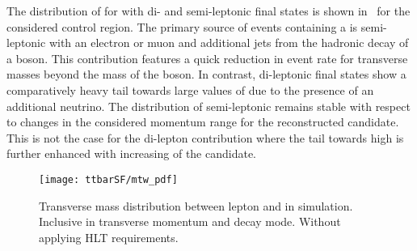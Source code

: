 The distribution of \mTW for \ttbar with di- and semi-leptonic final
states is shown in~ for the considered
control region.
The primary source of events containing a \faketauhadvis is
semi-leptonic \ttbar with an electron or muon and additional jets from
the hadronic decay of a \PW boson. This contribution features a quick
reduction in event rate for transverse masses beyond the mass of the
\PW boson. In contrast, di-leptonic \ttbar final states show a
comparatively heavy tail towards large values of \mTW due to the
presence of an additional neutrino.  The \mTW distribution of
semi-leptonic \ttbar remains stable with respect to changes in the
considered momentum range for the reconstructed \tauhadvis
candidate. This is not the case for the di-lepton contribution where
the tail towards high \mTW is further enhanced with increasing \pT of
the \tauhadvis candidate.




\begin{figure}[htbp]
  \centering

  \texttt{[image: ttbarSF/mtw\_pdf]}

  \caption{Transverse mass distribution between lepton and \pTmiss in
    \ttbar simulation. Inclusive in \tauhadvis transverse momentum and
    decay mode. Without applying HLT requirements.}
  \label{fig:ttbarsf_mtw_pdf}
\end{figure}




